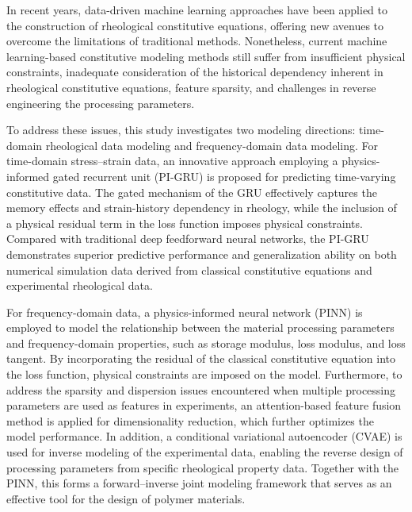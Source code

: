 In recent years, data-driven machine learning approaches have been applied to the construction of rheological constitutive equations, offering new avenues to overcome the limitations of traditional methods. Nonetheless, current machine learning-based constitutive modeling methods still suffer from insufficient physical constraints, inadequate consideration of the historical dependency inherent in rheological constitutive equations, feature sparsity, and challenges in reverse engineering the processing parameters.

To address these issues, this study investigates two modeling directions: time-domain rheological data modeling and frequency-domain data modeling. For time-domain stress–strain data, an innovative approach employing a physics-informed gated recurrent unit (PI-GRU) is proposed for predicting time-varying constitutive data. The gated mechanism of the GRU effectively captures the memory effects and strain-history dependency in rheology, while the inclusion of a physical residual term in the loss function imposes physical constraints. Compared with traditional deep feedforward neural networks, the PI-GRU demonstrates superior predictive performance and generalization ability on both numerical simulation data derived from classical constitutive equations and experimental rheological data.

For frequency-domain data, a physics-informed neural network (PINN) is employed to model the relationship between the material processing parameters and frequency-domain properties, such as storage modulus, loss modulus, and loss tangent. By incorporating the residual of the classical constitutive equation into the loss function, physical constraints are imposed on the model. Furthermore, to address the sparsity and dispersion issues encountered when multiple processing parameters are used as features in experiments, an attention-based feature fusion method is applied for dimensionality reduction, which further optimizes the model performance. In addition, a conditional variational autoencoder (CVAE) is used for inverse modeling of the experimental data, enabling the reverse design of processing parameters from specific rheological property data. Together with the PINN, this forms a forward–inverse joint modeling framework that serves as an effective tool for the design of polymer materials.
